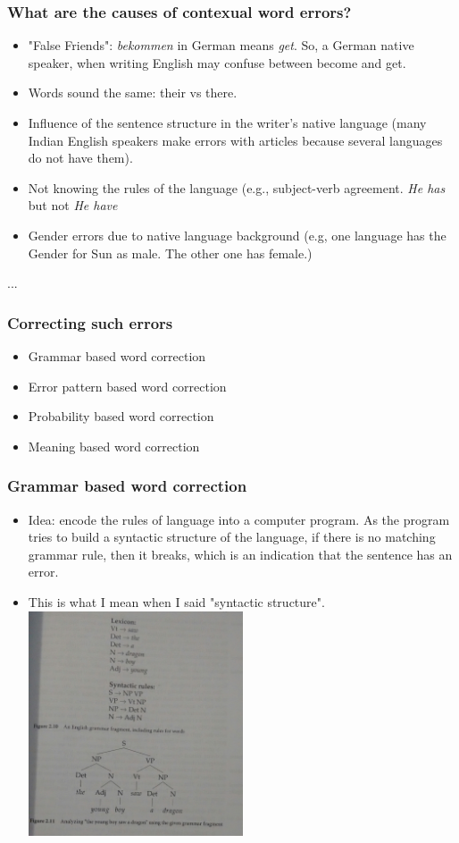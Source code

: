 \documentclass{beamer}
\begin{document}
\begin{frame}
\frametitle{What are the causes of contexual word errors?}
\begin{itemize}
\item "False Friends": \textit{bekommen} in German means \textit{get}. So, a German native speaker, when writing English may confuse between become and get. \pause
\item Words sound the same: their vs there. \pause
\item Influence of the sentence structure in the writer's native language (many Indian English speakers make errors with articles because several languages do not have them).  \pause
\item Not knowing the rules of the language (e.g., subject-verb agreement. \textit{He has} but not \textit{He have} \pause
\item Gender errors due to native language background (e.g, one language has the Gender for Sun as male. The other one has female.)
\end{itemize}
...
\end{frame}

\begin{frame}
\frametitle{Correcting such errors}
\begin{itemize}
\item Grammar based word correction
\item Error pattern based word correction
\item Probability based word correction
\item Meaning based word correction
\end{itemize}
\end{frame}

\begin{frame}
\frametitle{Grammar based word correction}
\begin{itemize}
\item Idea: encode the rules of language into a computer program. As the program tries to build a syntactic structure of the language, if there is no matching grammar rule, then it breaks, which is an indication that the sentence has an error.
\item \pause This is what I mean when I said "syntactic structure".
\includegraphics[width=0.5\textwidth]{parse.jpg}
\end{itemize}
\end{frame}
\end{document}
